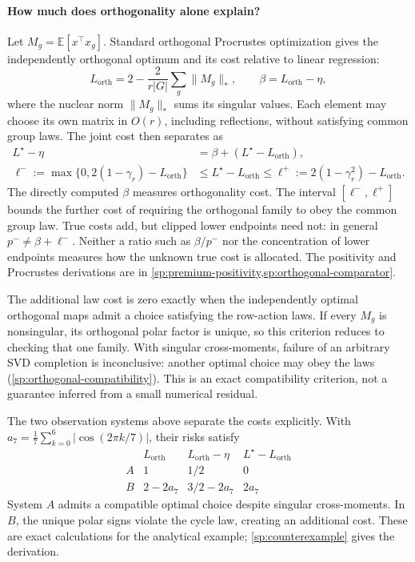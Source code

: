 \paragraph{How much does orthogonality alone explain?}
Let $M_g=\mathbb E[x^\top x_g]$. Standard orthogonal Procrustes optimization gives the independently orthogonal optimum and its cost relative to linear regression:
\[
 L_{\mathrm{orth}}=2-\frac{2}{r|G|}\sum_g\|M_g\|_*,\qquad
 \beta=L_{\mathrm{orth}}-\eta,
\]
where the nuclear norm $\|M_g\|_*$ sums its singular values. Each element may choose its own matrix in $O(r)$, including reflections, without satisfying common group laws. The joint cost then separates as
\begin{align*}
 L^\star-\eta&=\beta+(L^\star-L_{\mathrm{orth}}),\\
 \ell^-:=\max\{0,2(1-\gamma_r)-L_{\mathrm{orth}}\}
 &\le L^\star-L_{\mathrm{orth}}\le
 \ell^+:=2(1-\gamma_r^2)-L_{\mathrm{orth}}.
\end{align*}
The directly computed $\beta$ measures orthogonality cost. The interval $[\ell^-,\ell^+]$ bounds the further cost of requiring the orthogonal family to obey the common group law. True costs add, but clipped lower endpoints need not: in general $p^-\ne\beta+\ell^-$. Neither a ratio such as $\beta/p^-$ nor the concentration of lower endpoints measures how the unknown true cost is allocated. The positivity and Procrustes derivations are in \cref{sp:premium-positivity,sp:orthogonal-comparator}.

The additional law cost is zero exactly when the independently optimal orthogonal maps admit a choice satisfying the row-action laws. If every $M_g$ is nonsingular, its orthogonal polar factor is unique, so this criterion reduces to checking that one family. With singular cross-moments, failure of an arbitrary SVD completion is inconclusive: another optimal choice may obey the laws (\cref{sp:orthogonal-compatibility}). This is an exact compatibility criterion, not a guarantee inferred from a small numerical residual.

The two observation systems above separate the costs explicitly. With
$a_7=\frac17\sum_{k=0}^6|\cos(2\pi k/7)|$, their risks satisfy
\[
\begin{array}{c|ccc}
 & L_{\mathrm{orth}} & L_{\mathrm{orth}}-\eta & L^\star-L_{\mathrm{orth}}\\
 \hline
 A & 1 & 1/2 & 0\\
 B & 2-2a_7 & 3/2-2a_7 & 2a_7
\end{array}
\]
System $A$ admits a compatible optimal choice despite singular cross-moments. In $B$, the unique polar signs violate the cycle law, creating an additional cost. These are exact calculations for the analytical example; \cref{sp:counterexample} gives the derivation.

